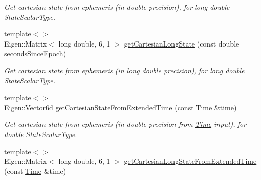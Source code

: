 \begin{DoxyCompactItemize}
\begin{DoxyCompactList}\small\item\em Get cartesian state from ephemeris (in double precision), for long double State\+Scalar\+Type. \end{DoxyCompactList}\item 
{\footnotesize template$<$$>$ }\\Eigen\+::\+Matrix$<$ long double, 6, 1 $>$ \hyperlink{classtudat_1_1ephemerides_1_1TabulatedCartesianEphemeris_a1ad7459c88b5ec8d18e4b1685f9f0636}{get\+Cartesian\+Long\+State} (const double seconds\+Since\+Epoch)\hypertarget{classtudat_1_1ephemerides_1_1TabulatedCartesianEphemeris_a1ad7459c88b5ec8d18e4b1685f9f0636}{}\label{classtudat_1_1ephemerides_1_1TabulatedCartesianEphemeris_a1ad7459c88b5ec8d18e4b1685f9f0636}

\begin{DoxyCompactList}\small\item\em Get cartesian state from ephemeris (in long double precision), for long double State\+Scalar\+Type. \end{DoxyCompactList}\item 
{\footnotesize template$<$$>$ }\\Eigen\+::\+Vector6d \hyperlink{classtudat_1_1ephemerides_1_1TabulatedCartesianEphemeris_aac5716d83a1b531a1d5aec3b4af4ca85}{get\+Cartesian\+State\+From\+Extended\+Time} (const \hyperlink{classtudat_1_1Time}{Time} \&time)\hypertarget{classtudat_1_1ephemerides_1_1TabulatedCartesianEphemeris_aac5716d83a1b531a1d5aec3b4af4ca85}{}\label{classtudat_1_1ephemerides_1_1TabulatedCartesianEphemeris_aac5716d83a1b531a1d5aec3b4af4ca85}

\begin{DoxyCompactList}\small\item\em Get cartesian state from ephemeris (in double precision from \hyperlink{classtudat_1_1Time}{Time} input), for double State\+Scalar\+Type. \end{DoxyCompactList}\item 
{\footnotesize template$<$$>$ }\\Eigen\+::\+Matrix$<$ long double, 6, 1 $>$ \hyperlink{classtudat_1_1ephemerides_1_1TabulatedCartesianEphemeris_afe9b0674df3fb95fea4481eb66b3ee44}{get\+Cartesian\+Long\+State\+From\+Extended\+Time} (const \hyperlink{classtudat_1_1Time}{Time} \&time)\hypertarget{classtudat_1_1ephemerides_1_1TabulatedCartesianEphemeris_afe9b0674df3fb95fea4481eb66b3ee44}{}\label{classtudat_1_1ephemerides_1_1TabulatedCartesianEphemeris_afe9b0674df3fb95fea4481eb66b3ee44}


\end{DoxyCompactItemize}
